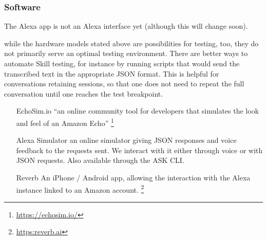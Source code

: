 \subsubsection*{Software}

The Alexa app is not an Alexa interface yet (although this will change soon).

while the hardware models stated above are possibilities for testing, too, they do not primarily serve an optimal testing environment. There are better ways to automate Skill testing, for instance by running scripts that would send the transcribed text in the appropriate JSON format. This is helpful for conversations retaining sessions, so that one does not need to repeat the full conversation until one reaches the test breakpoint.

\begin{itemize}
	\item[EchoSim.io] ``an online community tool for developers that simulates the look and feel of an Amazon Echo'' \footnote{\url{https://echosim.io/}}
	\item[Alexa Simulator] an online simulator giving JSON responses and voice feedback to the requests sent. We interact with it either through voice or with JSON requests. Also available through the ASK CLI.
	\item[Reverb] An iPhone / Android app, allowing the interaction with the Alexa instance linked to an Amazon account. \footnote{\url{https:reverb.ai}} 
\end{itemize}



















